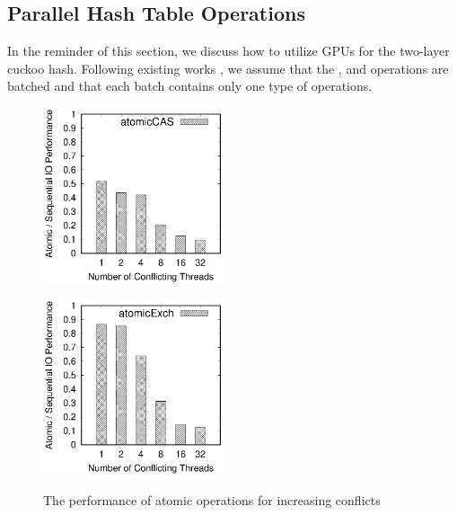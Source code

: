 \subsection{Parallel Hash Table Operations}\label{sec:vot:con}
In the reminder of this section, we discuss how to utilize GPUs for the two-layer cuckoo hash. Following existing works \cite{alcantara2009real,zhang2015mega,breslow2016horton}, we assume that the ,  and  operations are batched and that each batch contains only one type of operations. 

\begin{figure}[t]
	\centering
	\hspace{-3em}
	\begin{minipage}{0.5\linewidth}
		\label{fig:atomicCAS}
		\includegraphics[width=5.3cm]{exp/atomic/atomicCAS.eps}
	\end{minipage}
	\hspace{-1em}
	\begin{minipage}{0.5\linewidth}
		\label{fig:atomicExch}
		\includegraphics[width=5.3cm]{exp/atomic/atomicExch.eps}
	\end{minipage}
	\caption{The performance of atomic operations for increasing conflicts}
	\label{fig:atomic}
\end{figure}

